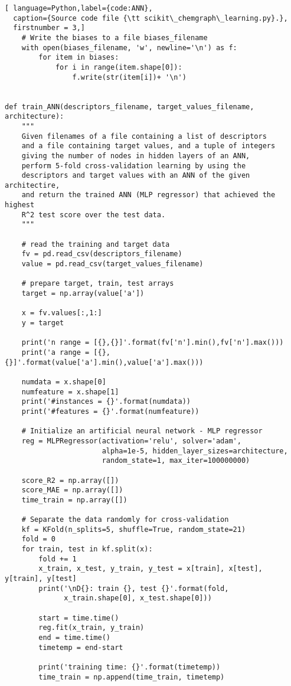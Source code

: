 \documentclass[11pt,titlepage,dvipdfmx,twoside]{article}
\begin{document}
\begin{lstlisting}[ language=Python,label={code:ANN},
  caption={Source code file {\tt scikit\_chemgraph\_learning.py}.},
  firstnumber = 3,]
    # Write the biases to a file biases_filename
    with open(biases_filename, 'w', newline='\n') as f:
        for item in biases:
            for i in range(item.shape[0]):
                f.write(str(item[i])+ '\n')
    

def train_ANN(descriptors_filename, target_values_filename, architecture):
    """
    Given filenames of a file containing a list of descriptors
    and a file containing target values, and a tuple of integers
    giving the number of nodes in hidden layers of an ANN,
    perform 5-fold cross-validation learning by using the 
    descriptors and target values with an ANN of the given architectire,
    and return the trained ANN (MLP regressor) that achieved the highest
    R^2 test score over the test data.
    """
    
    # read the training and target data
    fv = pd.read_csv(descriptors_filename) 
    value = pd.read_csv(target_values_filename)       
    
    # prepare target, train, test arrays
    target = np.array(value['a'])
    
    x = fv.values[:,1:]
    y = target
    
    print('n range = [{},{}]'.format(fv['n'].min(),fv['n'].max()))
    print('a range = [{},{}]'.format(value['a'].min(),value['a'].max()))
    
    numdata = x.shape[0]
    numfeature = x.shape[1]
    print('#instances = {}'.format(numdata))
    print('#features = {}'.format(numfeature))
    
    # Initialize an artificial neural network - MLP regressor
    reg = MLPRegressor(activation='relu', solver='adam',
                       alpha=1e-5, hidden_layer_sizes=architecture,
                       random_state=1, max_iter=100000000)
    
    score_R2 = np.array([])
    score_MAE = np.array([])
    time_train = np.array([])
    
    # Separate the data randomly for cross-validation
    kf = KFold(n_splits=5, shuffle=True, random_state=21)
    fold = 0
    for train, test in kf.split(x):
        fold += 1
        x_train, x_test, y_train, y_test = x[train], x[test], y[train], y[test]
        print('\nD{}: train {}, test {}'.format(fold, 
              x_train.shape[0], x_test.shape[0]))
    
        start = time.time()
        reg.fit(x_train, y_train)
        end = time.time()
        timetemp = end-start
        
        print('training time: {}'.format(timetemp))
        time_train = np.append(time_train, timetemp)
    

\end{lstlisting}
\end{document}

